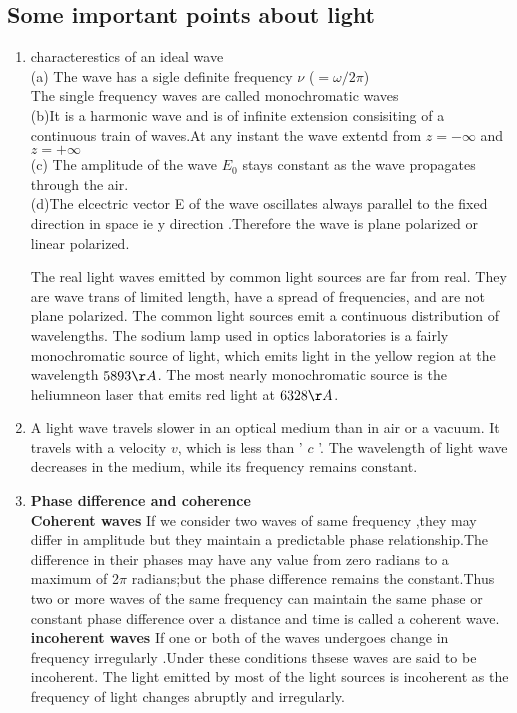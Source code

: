 \subsection{Some important points about light}
\begin{enumerate}
	\item characterestics of an ideal wave\\
	(a) The wave has a sigle definite frequency $\nu$ ($=\omega/2\pi$)\\
	The single frequency waves are called monochromatic waves\\
	(b)It is a harmonic wave and is of infinite extension consisiting of a continuous  train of waves.At any instant the wave extentd from $z=-\infty$ and $z=+\infty$\\
	(c) The amplitude of the wave $E_0$ stays constant as the wave propagates through the air.\\
	(d)The elcectric vector E of the wave oscillates always parallel to the fixed direction in space  ie y direction .Therefore the wave is plane polarized or linear polarized.
	\par The real light waves emitted by common light sources are far from real. They are wave trans of limited length, have a spread of frequencies, and are not plane polarized.  The common light sources emit a continuous distribution of wavelengths. The sodium lamp used in optics laboratories is a fairly monochromatic source of light, which emits light in the yellow region at the wavelength $5893 \AA$. The most nearly monochromatic source is the heliumneon laser that emits red light at $6328 \AA$.
	\item  A light wave travels slower in an optical medium than in air or a vacuum. It travels with a velocity $v$, which is less than ' $c$ '. The wavelength of light wave decreases in the medium, while its frequency remains constant.
	\item \textbf{Phase difference and coherence}\\
	\textbf{Coherent waves} If we consider two waves of same frequency ,they may differ in amplitude but they maintain a predictable phase relationship.The difference in their phases may have any value from zero radians to a maximum of 2$\pi$ radians;but the phase difference remains the constant.Thus two or more waves of the same frequency can maintain the same phase or constant phase difference over a distance and time  is called a coherent wave.\\
	\textbf{incoherent waves} If one or both of the waves undergoes change in frequency irregularly .Under these conditions thsese waves are said to be incoherent. The light emitted by most of the light sources is incoherent as the frequency of light changes abruptly and irregularly.\\

\end{enumerate}
